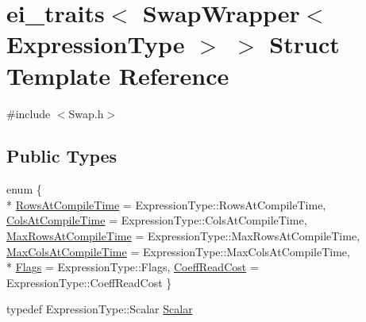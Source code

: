 \hypertarget{structei__traits_3_01_swap_wrapper_3_01_expression_type_01_4_01_4}{\section{ei\-\_\-traits$<$ Swap\-Wrapper$<$ Expression\-Type $>$ $>$ Struct Template Reference}
\label{structei__traits_3_01_swap_wrapper_3_01_expression_type_01_4_01_4}
}


{\ttfamily \#include $<$Swap.\-h$>$}

\subsection*{Public Types}
\begin{DoxyCompactItemize}
\item 
enum \{ \\*
\hyperlink{structei__traits_3_01_swap_wrapper_3_01_expression_type_01_4_01_4_a46239f8846d23cfd7a6e4f557d6de8a4ad54150b3439c1f1277a0175ddd0a6905}{Rows\-At\-Compile\-Time} = Expression\-Type\-:\-:Rows\-At\-Compile\-Time, 
\hyperlink{structei__traits_3_01_swap_wrapper_3_01_expression_type_01_4_01_4_a46239f8846d23cfd7a6e4f557d6de8a4ab066ba28e5ef06016d2f18e23a82315b}{Cols\-At\-Compile\-Time} = Expression\-Type\-:\-:Cols\-At\-Compile\-Time, 
\hyperlink{structei__traits_3_01_swap_wrapper_3_01_expression_type_01_4_01_4_a46239f8846d23cfd7a6e4f557d6de8a4a30dba64589e9846a30658cba02d09e77}{Max\-Rows\-At\-Compile\-Time} = Expression\-Type\-:\-:Max\-Rows\-At\-Compile\-Time, 
\hyperlink{structei__traits_3_01_swap_wrapper_3_01_expression_type_01_4_01_4_a46239f8846d23cfd7a6e4f557d6de8a4a261230778dd53bf9bb8eec9504206a7b}{Max\-Cols\-At\-Compile\-Time} = Expression\-Type\-:\-:Max\-Cols\-At\-Compile\-Time, 
\\*
\hyperlink{structei__traits_3_01_swap_wrapper_3_01_expression_type_01_4_01_4_a46239f8846d23cfd7a6e4f557d6de8a4a9407a61781f67f88213b404b3ef54b79}{Flags} = Expression\-Type\-:\-:Flags, 
\hyperlink{structei__traits_3_01_swap_wrapper_3_01_expression_type_01_4_01_4_a46239f8846d23cfd7a6e4f557d6de8a4a0c28a62d02256c1c2ff1af809d71e4f1}{Coeff\-Read\-Cost} = Expression\-Type\-:\-:Coeff\-Read\-Cost
 \}
\item 
typedef Expression\-Type\-::\-Scalar \hyperlink{structei__traits_3_01_swap_wrapper_3_01_expression_type_01_4_01_4_a4b2a47d42a42cfa2fc69c7353df75bc4}{Scalar}
\end{DoxyCompactItemize}


